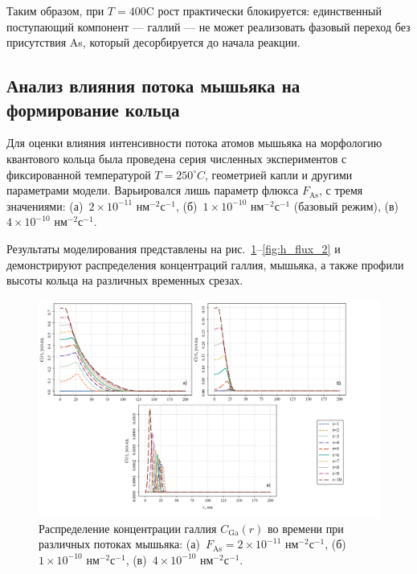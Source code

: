 \documentclass[14pt,oneside]{extarticle}
\begin{document}
Таким образом, при $T = 400$\textdegree C рост практически блокируется: единственный поступающий компонент — галлий — не может реализовать фазовый переход без присутствия As, который десорбируется до начала реакции.

\subsection{Анализ влияния потока мышьяка на формирование кольца}

Для оценки влияния интенсивности потока атомов мышьяка на морфологию квантового кольца была проведена серия численных экспериментов с фиксированной температурой \(T = 250^\circ C\), геометрией капли и другими параметрами модели. Варьировался лишь параметр флюкса \( F_{\text{As}} \), с тремя значениями: (а)~\(2 \times 10^{-11}\) нм$^{-2}$с$^{-1}$, (б)~\(1 \times 10^{-10}\) нм$^{-2}$с$^{-1}$ (базовый режим), (в)~\(4 \times 10^{-10}\) нм$^{-2}$с$^{-1}$.

Результаты моделирования представлены на рис.~\ref{fig:ga_flux_2}–\ref{fig:h_flux_2} и демонстрируют распределения концентраций галлия, мышьяка, а также профили высоты кольца на различных временных срезах.

\begin{figure}
    \begin{center}
    \includegraphics[width=18cm]{images/C_Ga_t_2.png}
    \caption{\label{fig:ga_flux_2} Распределение концентрации галлия $C_{\text{Ga}}(r)$ во времени при различных потоках мышьяка: (а)~$F_{\text{As}} = 2 \times 10^{-11}$ нм$^{-2}$с$^{-1}$, (б)~$1 \times 10^{-10}$ нм$^{-2}$с$^{-1}$, (в)~$4 \times 10^{-10}$ нм$^{-2}$с$^{-1}$.}
    \end{center}
\end{figure}
\end{document}
